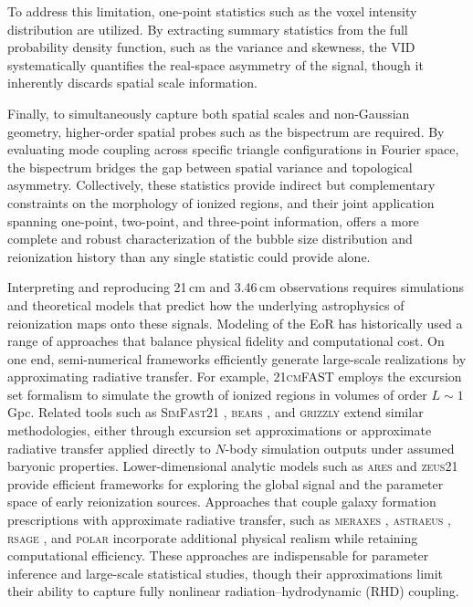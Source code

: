 \documentclass[apj,twocolumn, appendixfloats, twocolappendix, numberedappendix, tighten]{openjournal}
\begin{document}
To address this limitation, one-point statistics \citep[e.g.,][]{Wyithe2007, Harker2009, Patil2014, Watkinson2014, Shimabukuro2015, Kittiwisit2016, Ross2017} such as the voxel intensity distribution \citep[VID; e.g.,][]{Breysse2017, Sabla2024} are utilized. By extracting summary statistics from the full probability density function, such as the variance and skewness, the VID systematically quantifies the real-space asymmetry of the signal, though it inherently discards spatial scale information.

Finally, to simultaneously capture both spatial scales and non-Gaussian geometry, higher-order spatial probes such as the bispectrum \citep[a three-point statistic; e.g.,][]{Bharadwaj2005, Lewis2011, Yoshiura2015, Watkinson2017, Majumdar2018, Watkinson2019, Hutter2020a, Acharya2024} are required. By evaluating mode coupling across specific triangle configurations in Fourier space, the bispectrum bridges the gap between spatial variance and topological asymmetry. Collectively, these statistics provide indirect but complementary constraints on the morphology of ionized regions, and their joint application spanning one-point, two-point, and three-point information, offers a more complete and robust characterization of the bubble size distribution and reionization history than any single statistic could provide alone.


Interpreting and reproducing 21\,cm and 3.46\,cm observations requires simulations and theoretical models that predict how the underlying astrophysics of reionization maps onto these signals. Modeling of the EoR has historically used a range of approaches that balance physical fidelity and computational cost. On one end, semi-numerical frameworks efficiently generate large-scale realizations by approximating radiative transfer. For example, \textsc{21cmFAST} \citep[][]{Mesinger2011} employs the excursion set formalism to simulate the growth of ionized regions in volumes of order $L \sim 1$ Gpc. Related tools such as \textsc{SimFast21} \citep[][]{Santos2010a, Santos2010b}, \textsc{bears} \citep[][]{Thomas2009}, and \textsc{grizzly} \citep[][]{Ghara2023, Mukhopadhyay2025} extend similar methodologies, either through excursion set approximations or approximate radiative transfer applied directly to $N$-body simulation outputs under assumed baryonic properties. Lower-dimensional analytic models such as \textsc{ares} \citep[][]{Mirocha2014} and \textsc{zeus21} \citep[][]{Munoz2023a, Munoz2023b} provide efficient frameworks for exploring the global signal and the parameter space of early reionization sources. Approaches that couple galaxy formation prescriptions with approximate radiative transfer, such as \textsc{meraxes} \citep[][]{Mutch2016}, \textsc{astraeus} \citep[][]{Hutter2020, Hutter2021}, \textsc{rsage} \citep[][]{Seiler2019}, and \textsc{polar} \citep[][]{Ma_2023,Acharya_2025, Ma_2026} incorporate additional physical realism while retaining computational efficiency. These approaches are indispensable for parameter inference and large-scale statistical studies, though their approximations limit their ability to capture fully nonlinear radiation--hydrodynamic (RHD) coupling.
\end{document}
